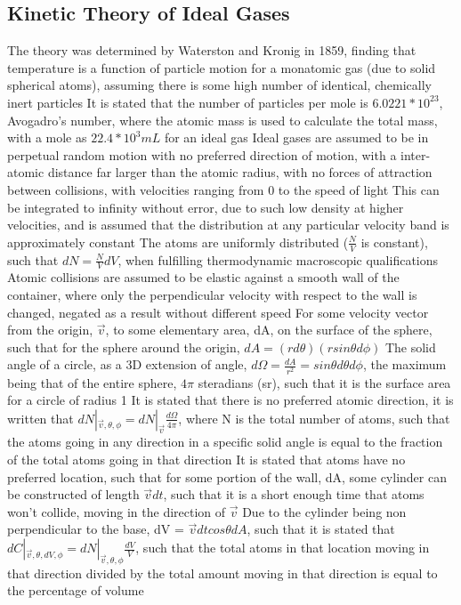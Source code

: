 \subsection{Kinetic Theory of Ideal Gases}
\begin{outline*}
\1 The theory was determined by Waterston and Kronig in 1859, finding that temperature is a function of particle motion for a monatomic gas (due to solid spherical atoms), assuming there is some high number of identical, chemically inert particles
\2 It is stated that the number of particles per mole is $6.0221 * 10^23$, Avogadro's number, where the atomic mass is used to calculate the total mass, with a mole as $22.4 * 10^3 mL$ for an ideal gas
\2 Ideal gases are assumed to be in perpetual random motion with no preferred direction of motion, with a inter-atomic distance far larger than the atomic radius, with no forces of attraction between collisions, with velocities ranging from 0 to the speed of light
\3 This can be integrated to infinity without error, due to such low density at higher velocities, and is assumed that the distribution at any particular velocity band is approximately constant
\2 The atoms are uniformly distributed ($\frac{N}{V}$ is constant), such that $dN = \frac{N}{V}dV$, when fulfilling thermodynamic macroscopic qualifications
\2 Atomic collisions are assumed to be elastic against a smooth wall of the container, where only the perpendicular velocity with respect to the wall is changed, negated as a result without different speed
\1 For some velocity vector from the origin, $\vec{v}$, to some elementary area, dA, on the surface of the sphere, such that for the sphere around the origin, $dA = (rd\theta)(rsin\theta d\phi)$
\2 The solid angle of a circle, as a 3D extension of angle, $d\Omega = \frac{dA}{r^2} = sin \theta d\theta d\phi$, the maximum being that of the entire sphere, $4\pi$ steradians (sr), such that it is the surface area for a circle of radius 1
\1 It is stated that there is no preferred atomic direction, it is written that $dN|_{\vec{v}, \theta, \phi} = dN|_\vec{v} \frac{d\Omega}{4\pi}$, where N is the total number of atoms, such that the atoms going in any direction in a specific solid angle is equal to the fraction of the total atoms going in that direction
\1 It is stated that atoms have no preferred location, such that for some portion of the wall, dA, some cylinder can be constructed of length $\vec{v}dt$, such that it is a short enough time that atoms won't collide, moving in the direction of $\vec{v}$
\2 Due to the cylinder being non perpendicular to the base, dV = $\vec{v}dt cos\theta dA$, such that it is stated that $dC|_{\vec{v}, \theta, dV, \phi} = dN|_{\vec{v}, \theta, \phi}\frac{dV}{V}$, such that the total atoms in that location moving in that direction divided by the total amount moving in that direction is equal to the percentage of volume

\end{outline*}
